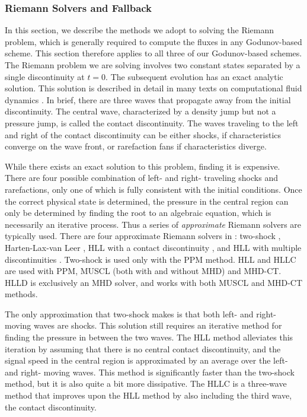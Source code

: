 \subsubsection{Riemann Solvers and Fallback}
\label{sec.riemann}

In this section, we describe the methods we adopt to solving the Riemann
problem, which is generally required to compute the fluxes in 
any Godunov-based scheme.  This section therefore applies to all three of our 
Godunov-based schemes.  The Riemann problem we are solving
involves two constant states separated by a single discontinuity at $t=0$.
The subsequent evolution has an exact analytic solution.  This solution is
described in detail in many texts on computational fluid dynamics
\citep[e.g.,][]{toro-1997}.   In brief, there are three waves that propagate
away from the initial discontinuity.  The central wave, characterized by a
density jump but not a pressure jump, is called the contact discontinuity.  The
waves traveling to the left and right of the contact discontinuity can be either
shocks, if characteristics converge on the wave front, or rarefaction fans if
characteristics diverge.  

While there exists an exact solution to this problem, finding it is expensive.  There are four
possible combination of left- and right- traveling shocks and rarefactions,
only one of which is fully consistent with the initial conditions.  Once the
correct physical state is determined, the pressure in the central region can
only be determined by finding the root to an algebraic equation, which is necessarily
an iterative process.  Thus a series of \emph{approximate} Riemann solvers are
typically used.  There are four approximate Riemann solvers in \enzo: two-shock
\citep{toro-1997},
Harten-Lax-van Leer \citep[HLL,][]{toro-1997}, HLL with a contact discontinuity
 \citep[HLLC,][]{toro-1997}, and HLL with
multiple discontinuities \citep[HLLD,][]{Miyoshi05}.  Two-shock is used only
with the PPM method.  HLL and HLLC are used with PPM, MUSCL (both with and
without MHD) and MHD-CT.  HLLD is exclusively an MHD solver, and works with both
MUSCL and MHD-CT methods.  

The only approximation that two-shock makes is that both left- and right- moving
waves are shocks.  This solution still requires an iterative method for finding
the pressure in between the two waves.  The HLL method alleviates this iteration
by assuming that there is no central contact discontinuity, and the signal speed
in the central region is approximated by an average over the left- and right-
moving waves.  This method is significantly faster than the two-shock method,
but it is also quite a bit more dissipative.  The HLLC is a three-wave method that improves upon the HLL
method by also including the third wave, the contact discontinuity.  

